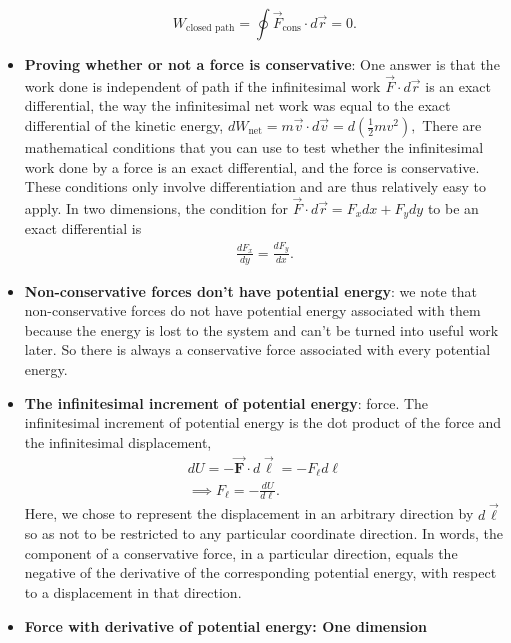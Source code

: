 \documentclass{report}
\begin{document}
\begin{itemize}
        \[
            W_{\text{closed path}} = \oint \vec{F}_{\text{cons}} \cdot d\vec{r} = 0.
        \]
        \item \textbf{Proving whether or not a force is conservative}:
            One answer is that the work done is independent of path if the infinitesimal work $\vec{F} \cdot d\vec{r}$ is an exact differential, the way the infinitesimal net work was equal to the exact differential of the kinetic energy, $dW_{\text{net}} = m\vec{v} \cdot d\vec{v} = d\left(\frac{1}{2}mv^2\right),$
            \bigbreak \noindent 
            There are mathematical conditions that you can use to test whether the infinitesimal work done by a force is an exact differential, and the force is conservative. These conditions only involve differentiation and are thus relatively easy to apply. In two dimensions, the condition for $\vec{F} \cdot d\vec{r} = F_x dx + F_y dy$ to be an exact differential is
            \begin{align*}
                \frac{dF_{x}}{dy} = \frac{dF_{y}}{dx}
            .\end{align*}
    \item \textbf{Non-conservative forces don't have potential energy}: we note that non-conservative forces do not have potential energy associated with them because the energy is lost to the system and can’t be turned into useful work later. So there is always a conservative force associated with every potential energy.
    \item \textbf{The infinitesimal increment of potential energy}:
        force. The infinitesimal increment of potential energy is the dot product of the force and the infinitesimal displacement,
        \begin{align*}
            dU = -\vec{\mathbf{F}} \cdot d\vec{\mathbf{\ell}} = -F_{\ell}d\ell \\
            \implies F_{\ell} = - \frac{dU}{d\ell}
        .\end{align*}
        \bigbreak \noindent 
        Here, we chose to represent the displacement in an arbitrary direction by  $d\vec{\mathbf{\ell}}$ so as not to be restricted to any particular coordinate direction.
        \bigbreak \noindent 
        In words, the component of a conservative force, in a particular direction, equals the negative of the derivative of the corresponding potential energy, with respect to a displacement in that direction.
    \item \textbf{Force with derivative of potential energy: One dimension}
        \begin{align*}

\end{align*}
\end{itemize}
\end{document}
